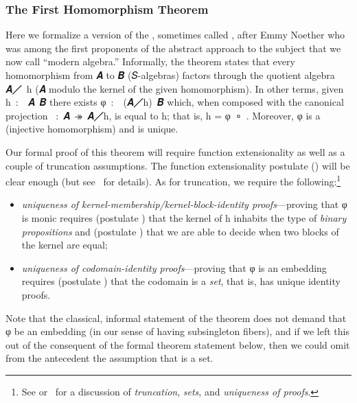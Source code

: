 \subsubsection{The First Homomorphism Theorem}\label{the-first-homomorphism-theorem}

Here we formalize a version of the , sometimes called , after Emmy Noether who was among the first proponents of the abstract approach to the subject that we now call ``modern algebra.''  Informally, the theorem states that every homomorphism from \ab 𝑨 to \ab 𝑩 (\ab 𝑆-algebras) factors through the quotient algebra \ab 𝑨\af ╱~\ab h (\ab 𝑨 modulo the kernel of the given homomorphism).  In other terms, given \ab h~\as :~~\ab 𝑨~\ab 𝑩 there exists \ab φ~\as :~~(\ab 𝑨\af ╱\ab h)~\ab 𝑩 which, when composed with the canonical projection ~\as :~\ab 𝑨~\af ↠~\ab 𝑨\af ╱\ab h, is equal to \ab h; that is, \ab h = \ab φ~\af ∘~.  Moreover, \ab φ is a  (injective homomorphism) and is unique.

Our formal proof of this theorem will require function extensionality as well as a couple of truncation assumptions. The function extensionality postulate () will be clear enough (but see~\cite{DeMeo:2021-1} for details).  As for truncation, we require the following:\footnote{See  or~\cite{DeMeo:2021-1} for a discussion of \emph{truncation}, \emph{sets}, and \emph{uniqueness of proofs}.}
\begin{itemize}
\item \emph{uniqueness of kernel-membership/kernel-block-identity proofs}---proving that \ab φ is monic requires (postulate ) that the kernel of \ab h inhabits the type  of \emph{binary propositions} and (postulate ) that we are able to decide when two blocks of the kernel are equal;
\item \emph{uniqueness of codomain-identity proofs}---proving that \ab φ is an embedding requires (postulate ) that the codomain \AgdaSpace{}%
\AgdaSpace{}%
 is a \emph{set}, that is, has unique identity proofs.
\end{itemize}
Note that the classical, informal statement of the theorem does not demand that \ab φ be an embedding (in our sense of having subsingleton fibers), and if we left this out of the consequent of the formal theorem statement below, then we could omit from the antecedent the assumption that 
\AgdaSpace{}\AgdaSpace{} is a set.

